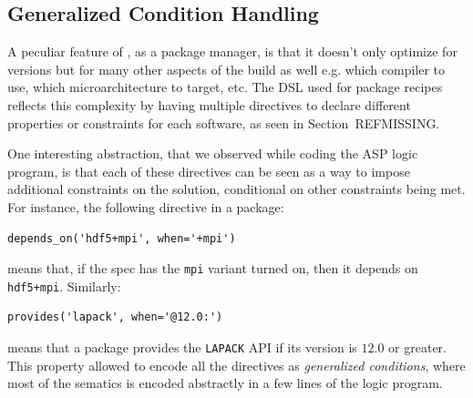 \subsection{Generalized Condition Handling}
\label{subsec:generalizedcond}
A peculiar feature of \spack, as a package manager, is that it doesn't only optimize for versions but for many other aspects of the build as well e.g. which compiler to use, which microarchitecture to target, etc. 
The DSL used for package recipes reflects this complexity by having multiple directives to declare different properties or constraints for each software, as seen in Section~REFMISSING. 

One interesting abstraction, that we observed while coding the ASP logic program, is that each of these directives can be seen as a way to impose additional constraints on the solution, conditional on other constraints 
being met. For instance, the following directive in a package:
\begin{verbatim}
depends_on('hdf5+mpi', when='+mpi')
\end{verbatim}
means that, if the spec has the \texttt{mpi} variant turned on, then it depends on \texttt{hdf5+mpi}. Similarly:
\begin{verbatim}
provides('lapack', when='@12.0:')
\end{verbatim}
means that a package provides the \texttt{LAPACK} API if its version is $12.0$ or greater.
This property allowed to encode all the directives as \emph{generalized conditions}, where most of the sematics is encoded abstractly in a few lines of the logic program.

